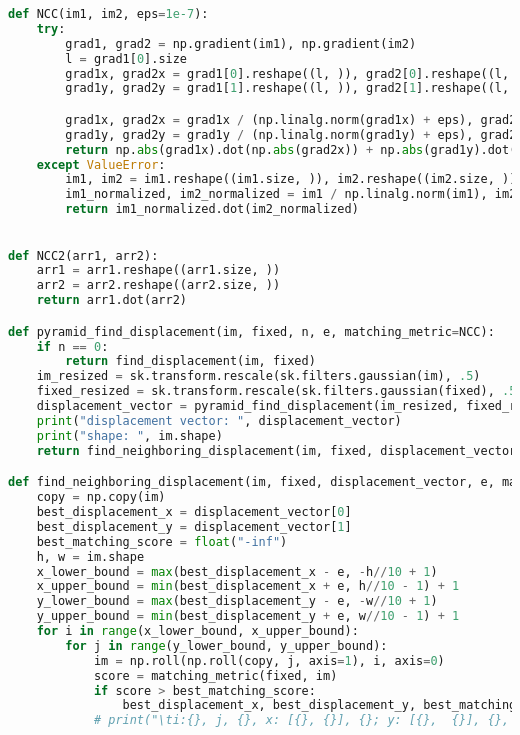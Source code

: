 \documentclass[withoutpreface,bwprint]{cumcmthesis} %
\begin{document}
\begin{appendices}
\begin{lstlisting}[language=python]
def NCC(im1, im2, eps=1e-7):
	try:
		grad1, grad2 = np.gradient(im1), np.gradient(im2)
		l = grad1[0].size
		grad1x, grad2x = grad1[0].reshape((l, )), grad2[0].reshape((l, ))
		grad1y, grad2y = grad1[1].reshape((l, )), grad2[1].reshape((l, ))

		grad1x, grad2x = grad1x / (np.linalg.norm(grad1x) + eps), grad2x / (np.linalg.norm(grad2x) + eps)
		grad1y, grad2y = grad1y / (np.linalg.norm(grad1y) + eps), grad2y / (np.linalg.norm(grad2y) + eps)
		return np.abs(grad1x).dot(np.abs(grad2x)) + np.abs(grad1y).dot(np.abs(grad2y))
	except ValueError:
		im1, im2 = im1.reshape((im1.size, )), im2.reshape((im2.size, ))
		im1_normalized, im2_normalized = im1 / np.linalg.norm(im1), im2 / np.linalg.norm(im2)
		return im1_normalized.dot(im2_normalized)

    
def NCC2(arr1, arr2):
	arr1 = arr1.reshape((arr1.size, ))
	arr2 = arr2.reshape((arr2.size, ))
	return arr1.dot(arr2)

def pyramid_find_displacement(im, fixed, n, e, matching_metric=NCC):
	if n == 0:
		return find_displacement(im, fixed)
	im_resized = sk.transform.rescale(sk.filters.gaussian(im), .5)
	fixed_resized = sk.transform.rescale(sk.filters.gaussian(fixed), .5)
	displacement_vector = pyramid_find_displacement(im_resized, fixed_resized, n - 1, e * 2) * 2
	print("displacement vector: ", displacement_vector)
	print("shape: ", im.shape)
	return find_neighboring_displacement(im, fixed, displacement_vector, e, matching_metric)

def find_neighboring_displacement(im, fixed, displacement_vector, e, matching_metric=NCC):
	copy = np.copy(im)
	best_displacement_x = displacement_vector[0]
	best_displacement_y = displacement_vector[1]
	best_matching_score = float("-inf")
	h, w = im.shape
	x_lower_bound = max(best_displacement_x - e, -h//10 + 1)
	x_upper_bound = min(best_displacement_x + e, h//10 - 1) + 1
	y_lower_bound = max(best_displacement_y - e, -w//10 + 1)
	y_upper_bound = min(best_displacement_y + e, w//10 - 1) + 1
	for i in range(x_lower_bound, x_upper_bound):
		for j in range(y_lower_bound, y_upper_bound):
			im = np.roll(np.roll(copy, j, axis=1), i, axis=0)
			score = matching_metric(fixed, im)
			if score > best_matching_score:
				best_displacement_x, best_displacement_y, best_matching_score = i, j, score
			# print("\ti:{}, j, {}, x: [{}, {}], {}; y: [{},  {}], {}, score: {}, best score: {}".format(i, j, x_lower_bound, x_upper_bound, best_displacement_x, y_lower_bound, y_upper_bound, best_displacement_y, score, best_matching_score))


\end{lstlisting}
\end{appendices}
\end{document}
